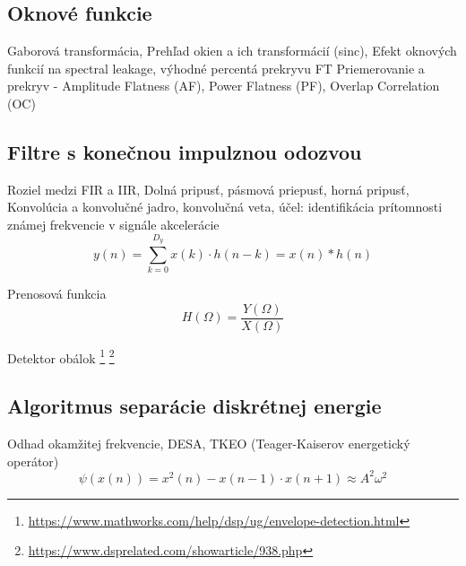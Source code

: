\subsection{Oknové funkcie}
Gaborová transformácia, Prehľad okien a ich transformácií (sinc), Efekt oknových funkcií na spectral leakage, výhodné percentá prekryvu FT 	\cite{understanding-dsp} \cite{spectral-density-estimation}
Priemerovanie a prekryv - Amplitude Flatness (AF), Power Flatness (PF), Overlap Correlation (OC)

\subsection{Filtre s konečnou impulznou odozvou}
Roziel medzi FIR a IIR, Dolná pripusť, pásmová priepusť, horná pripusť,
 Konvolúcia a konvolučné jadro, konvolučná veta, účel: identifikácia prítomnosti známej frekvencie v signále akcelerácie
\begin{equation}
y(n) = \sum_{k=0}^{D_y}{x(k) \cdot h(n-k)} = x(n) * h(n)
\end{equation}

Prenosová funkcia
\begin{equation}
H(\Omega) = \frac{Y(\Omega)}{X(\Omega)}
\end{equation}	

Detektor obálok	\footnote{\url{https://www.mathworks.com/help/dsp/ug/envelope-detection.html}} \footnote{\url{https://www.dsprelated.com/showarticle/938.php}}

\subsection{Algoritmus separácie diskrétnej energie}
Odhad okamžitej frekvencie, DESA, TKEO (Teager-Kaiserov energetický operátor) \cite{eeg-spanok} 
\begin{equation}
\psi(x(n)) = x^2(n) - x(n-1) \cdot x(n+1) \approx A^2\omega^2
\end{equation}
	
\emptypage 
